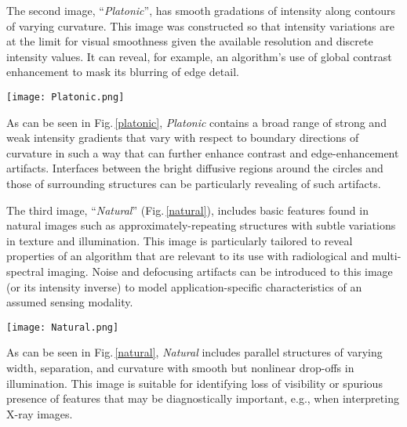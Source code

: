 \documentclass{article}
\begin{document}
The second image, ``{\em Platonic}'', has smooth gradations of intensity
along contours of varying curvature. This image was constructed so that
intensity variations are at the limit for visual smoothness given the
available resolution and discrete intensity values. It can reveal,
for example, an algorithm's use of global contrast enhancement to
mask its blurring of edge detail. 
\begin{figure*}
\centering
   \texttt{[image: Platonic.png]}
\caption{``Platonic'' - Smooth intensity gradations.}
\label{platonic}
\end{figure*}
As can be seen in Fig.\,\ref{platonic}, {\em Platonic} contains a broad range of strong and weak intensity
gradients that vary with respect to boundary directions of curvature in 
such a way that can further enhance contrast and edge-enhancement 
artifacts. Interfaces between the bright diffusive regions around the 
circles and those of surrounding structures can be particularly
revealing of such artifacts.

The third image, ``{\em Natural}'' (Fig.\,\ref{natural}), includes basic features found in natural images 
such as approximately-repeating structures with subtle variations in 
texture and illumination. This image is particularly tailored to reveal properties of 
an algorithm that are relevant to its use with radiological and multi-spectral 
imaging. Noise and defocusing artifacts can be introduced to this
image (or its intensity inverse) to model application-specific characteristics of an 
assumed sensing modality. 
\begin{figure*}
   \centering
   \texttt{[image: Natural.png]}
\caption{``Natural'' - Structures common to natural images.}
\label{natural}
\end{figure*}

As can be seen in Fig.\,\ref{natural}, 
{\em Natural} includes parallel structures of varying width, separation, and
curvature with smooth but nonlinear drop-offs in illumination. This image
is suitable for identifying loss of visibility or spurious presence of features
that may be diagnostically important, e.g., when interpreting X-ray
images.  
\end{document}
